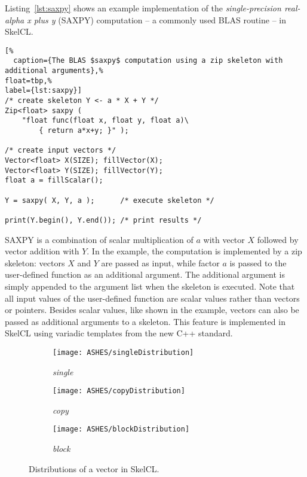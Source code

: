 Listing~\ref{lst:saxpy} shows an example implementation of the \emph{single-precision real-alpha x plus y} (SAXPY) computation -- a commonly used BLAS routine -- in SkelCL.
\begin{lstlisting}[%
  caption={The BLAS $saxpy$ computation using a zip skeleton with additional arguments},%
float=tbp,%
label={lst:saxpy}]
/* create skeleton Y <- a * X + Y */
Zip<float> saxpy (
    "float func(float x, float y, float a)\
        { return a*x+y; }" );

/* create input vectors */
Vector<float> X(SIZE); fillVector(X);
Vector<float> Y(SIZE); fillVector(Y);
float a = fillScalar();

Y = saxpy( X, Y, a );      /* execute skeleton */

print(Y.begin(), Y.end()); /* print results */
\end{lstlisting}
SAXPY is a combination of scalar multiplication of $a$ with vector $X$ followed by vector addition with $Y$.
In the example, the computation is implemented by a zip skeleton:
vectors $X$ and $Y$ are passed as input, while factor $a$ is passed to the user-defined function as an additional argument.
The additional argument is simply appended to the argument list when the skeleton is executed.
Note that all input values of the user-defined function are scalar values rather than vectors or pointers.
Besides scalar values, like shown in the example, vectors can also be passed as additional arguments to a skeleton.
This feature is implemented in SkelCL using variadic templates from the new C++ standard\cite{gregor08, c++11}.
 
\begin{figure}[tb]
  \centering
  \begin{subfigure}{.30\textwidth}
    \texttt{[image: ASHES/singleDistribution]}
    \caption{\emph{single}}
    \label{fig:distributions:single}
  \end{subfigure}
  \hfill
  \begin{subfigure}{.30\textwidth}
    \texttt{[image: ASHES/copyDistribution]}
    \caption{\emph{copy}}
    \label{fig:distributions:copy}
  \end{subfigure}
  \hfill
  \begin{subfigure}{.30\textwidth}
    \texttt{[image: ASHES/blockDistribution]}
    \caption{\emph{block}}
    \label{fig:distributions:block}
  \end{subfigure}
  \caption{Distributions of a vector in SkelCL.}
  \label{fig:distributions}
  \bigskip
\end{figure}


